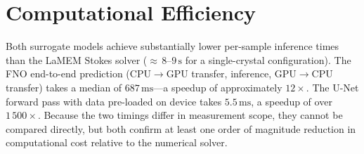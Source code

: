 \section{Computational Efficiency}
\label{sec:results:efficiency}

Both surrogate models achieve substantially lower per-sample inference times than the LaMEM Stokes solver (${\approx}\,8$–$9\,\text{s}$ for a single-crystal configuration). The FNO end-to-end prediction (CPU$\to$GPU transfer, inference, GPU$\to$CPU transfer) takes a median of $687\,\text{ms}$—a speedup of approximately $12\times$. The U-Net forward pass with data pre-loaded on device takes $5.5\,\text{ms}$, a speedup of over $1\,500\times$. Because the two timings differ in measurement scope, they cannot be compared directly, but both confirm at least one order of magnitude reduction in computational cost relative to the numerical solver.


